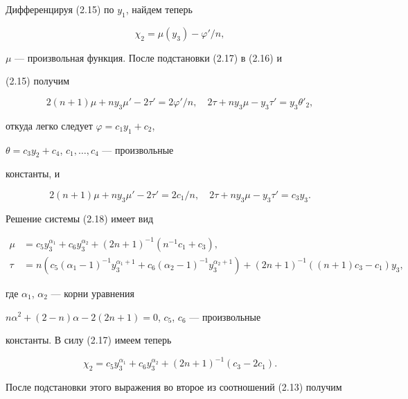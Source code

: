 Дифференцируя (2.15) по $y_1$, найдем теперь


\begin{equation}


\chi_2=\mu(y_3)-\varphi'/n,\tag{2.17}


\end{equation}


$\mu$ --- произвольная функция. После подстановки (2.17) в (2.16) и


(2.15) получим


$$


2(n+1)\mu+ny_3\mu'-2\tau'=2\varphi'/n,\quad


2\tau+ny_3\mu-y_3\tau'=y_3\theta'_2,


$$


откуда легко следует $\varphi=c_1y_1+c_2$,


$\theta=c_3y_2+c_4$, $c_1,\dotsc,c_4$ --- произвольные


константы, и


\begin{equation}


2(n+1)\mu+ny_3\mu'-2\tau'=2c_1/n,\quad


2\tau+ny_3\mu-y_3\tau'=c_3y_3.\tag{2.18}


\end{equation}


Решение системы (2.18) имеет вид


\begin{align*}


\mu&=c_5y^{\alpha_1}_3+c_6y^{\alpha_2}_3+(2n+1)^{-1}


(n^{-1}c_1+c_3),\\


\tau&=n(c_5(\alpha_1-1)^{-1}y^{\alpha_1+1}_3+


c_6(\alpha_2-1)^{-1}y^{\alpha_2+1}_3)+(2n+1)^{-1}((n+1)c_3-c_1)y_3,


\end{align*}


где $\alpha_1$, $\alpha_2$ --- корни уравнения


$n\alpha^2+(2-n)\alpha-2(2n+1)=0$, $c_5$, $c_6$ --- произвольные


константы. В силу (2.17) имеем теперь


$$


\chi_2=c_5y^{\alpha_1}_3+c_6y^{\alpha_2}_3+(2n+1)^{-1}(c_3-2c_1).


$$


После подстановки этого выражения во второе из соотношений (2.13) получим


